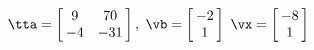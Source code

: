 {$\tta = \left[\hskip -3pt \begin{array}{cc} 9&70\\  -4&-31\end {array} \hskip -3pt
 \right],$
 \quad
$\vb =\left[\hskip -3pt \begin{array}{c} -2\\  1\end {array} \hskip -3pt
 \right]$ 
}
{$\vx = \left[\hskip -3pt \begin{array}{c} -8\\  1\end {array} \hskip -3pt
 \right]$}
 